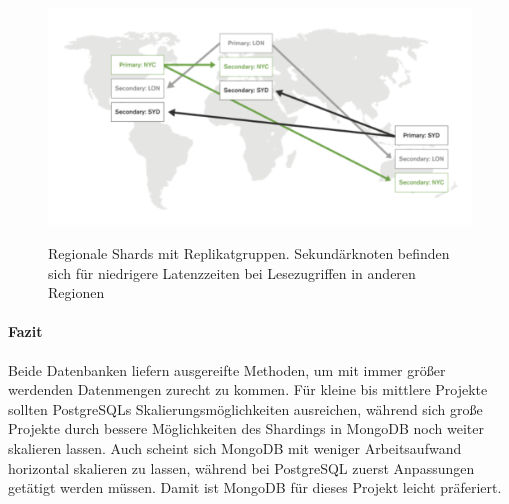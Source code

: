 \begin{figure}
	\centering
    \includegraphics[width=\textwidth]{sources/MongoDB_sharded.png}\cite{MG10}
	\caption{Regionale Shards mit Replikatgruppen. Sekundärknoten befinden sich für niedrigere Latenzzeiten bei Lesezugriffen in anderen Regionen}
	\label{fig1}
\end{figure}

\paragraph{Fazit\\}
Beide Datenbanken liefern ausgereifte Methoden, um mit immer größer werdenden Datenmengen zurecht zu kommen. Für kleine bis mittlere Projekte sollten PostgreSQLs Skalierungsmöglichkeiten ausreichen, während sich große Projekte durch bessere Möglichkeiten des Shardings in MongoDB noch weiter skalieren lassen. Auch scheint sich MongoDB mit weniger Arbeitsaufwand horizontal skalieren zu lassen, während bei PostgreSQL zuerst Anpassungen getätigt werden müssen. Damit ist MongoDB für dieses Projekt leicht präferiert.

